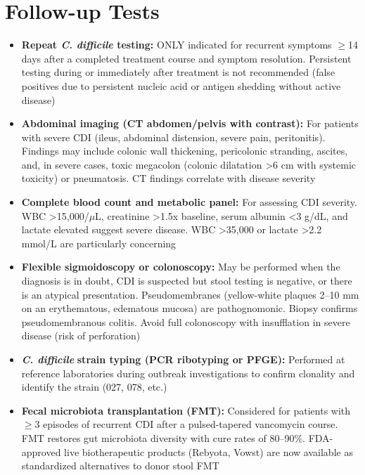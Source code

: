 \section*{Follow-up Tests}
\begin{itemize}
  \item \textbf{Repeat \textit{C. difficile} testing:} ONLY indicated for recurrent symptoms $\geq$14 days after a completed treatment course and symptom resolution. Persistent testing during or immediately after treatment is not recommended (false positives due to persistent nucleic acid or antigen shedding without active disease)
  \item \textbf{Abdominal imaging (CT abdomen/pelvis with contrast):} For patients with severe CDI (ileus, abdominal distension, severe pain, peritonitis). Findings may include colonic wall thickening, pericolonic stranding, ascites, and, in severe cases, toxic megacolon (colonic dilatation >6 cm with systemic toxicity) or pneumatosis. CT findings correlate with disease severity
  \item \textbf{Complete blood count and metabolic panel:} For assessing CDI severity. WBC >15,000/$\mu$L, creatinine >1.5x baseline, serum albumin <3 g/dL, and lactate elevated suggest severe disease. WBC >35,000 or lactate >2.2 mmol/L are particularly concerning
  \item \textbf{Flexible sigmoidoscopy or colonoscopy:} May be performed when the diagnosis is in doubt, CDI is suspected but stool testing is negative, or there is an atypical presentation. Pseudomembranes (yellow-white plaques 2--10 mm on an erythematous, edematous mucosa) are pathognomonic. Biopsy confirms pseudomembranous colitis. Avoid full colonoscopy with insufflation in severe disease (risk of perforation)
  \item \textit{\textbf{C. difficile}} \textbf{strain typing (PCR ribotyping or PFGE):} Performed at reference laboratories during outbreak investigations to confirm clonality and identify the strain (027, 078, etc.)
  \item \textbf{Fecal microbiota transplantation (FMT):} Considered for patients with $\geq$3 episodes of recurrent CDI after a pulsed-tapered vancomycin course. FMT restores gut microbiota diversity with cure rates of 80--90\%. FDA-approved live biotherapeutic products (Rebyota, Vowst) are now available as standardized alternatives to donor stool FMT
\end{itemize}

